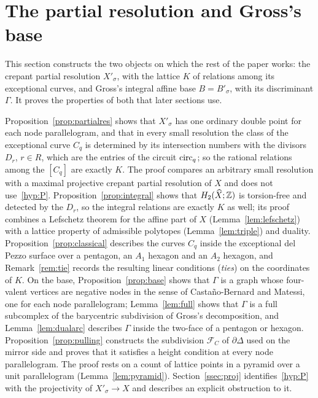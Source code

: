 \section{The partial resolution and Gross's base}\label{sec:base}

This section constructs the two objects on which the rest of the paper works: the crepant partial resolution
$X'_\sigma$, with the lattice $K$ of relations among its exceptional curves, and Gross's integral affine base
$B=B'_\sigma$, with its discriminant $\Gamma$. It proves the properties of both that later sections use.

Proposition~\ref{prop:partialres} shows that $X'_\sigma$ has one ordinary double point for each node parallelogram,
and that in every small resolution the class of the exceptional curve $C_q$ is determined by its intersection numbers
with the divisors $D_r$, $r\in R$, which are the entries of the circuit $\mathrm{circ}_q$; so the rational relations among the
$[C_q]$ are exactly $K$. The proof compares an arbitrary small resolution with a maximal projective crepant partial
resolution of $X$ and does not use~\ref{hyp:P}. Proposition~\ref{prop:integral} shows that $H_2(\widehat X;\mathbb Z)$ is
torsion-free and detected by the $D_r$, so the integral relations are exactly $K$ as well; its proof combines a
Lefschetz theorem for the affine part of $X$ (Lemma~\ref{lem:lefschetz}) with a lattice property of admissible
polytopes (Lemma~\ref{lem:triple}) and duality. Proposition~\ref{prop:classical} describes the curves $C_q$ inside
the exceptional del Pezzo surface over a pentagon, an $A_1$ hexagon and an $A_2$ hexagon, and Remark~\ref{rem:tie}
records the resulting linear conditions (\emph{ties}) on the coordinates of $K$. On the base,
Proposition~\ref{prop:base} shows that $\Gamma$ is a graph whose four-valent vertices are negative nodes in the sense
of Casta\~no-Bernard and Matessi, one for each node parallelogram; Lemma~\ref{lem:full} shows that $\Gamma$ is a full
subcomplex of the barycentric subdivision of Gross's decomposition, and Lemma~\ref{lem:dualarc} describes $\Gamma$ inside the two-face of a
pentagon or hexagon. Proposition~\ref{prop:pulling} constructs the subdivision $\mathcal F_C$ of $\partial\Delta$ used on
the mirror side and proves that it satisfies a height condition at every node parallelogram. The proof rests on a
count of lattice points in a pyramid over a unit parallelogram (Lemma~\ref{lem:pyramid}). Section~\ref{ssec:proj}
identifies~\ref{hyp:P} with the projectivity of $X'_\sigma\to X$ and describes an explicit obstruction to it.

